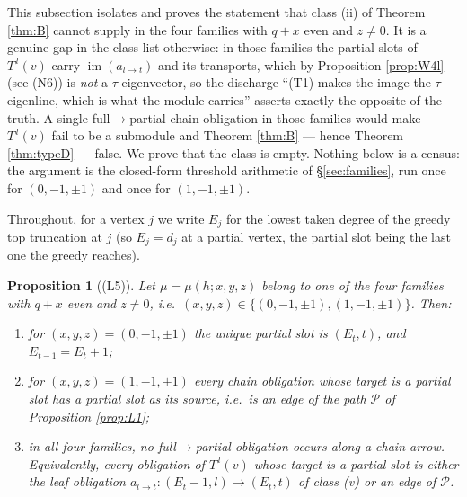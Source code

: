 \documentclass[reqno]{amsart}
\theoremstyle{plain}
\newtheorem{proposition}[theorem]{Proposition}
\theoremstyle{definition}
\DeclareMathOperator{\im}{im}
\begin{document}
This subsection isolates and proves the statement that class (ii) of Theorem
\ref{thm:B} cannot supply in the four families with $q+x$ even and $z\ne0$.
It is a genuine gap in the class list otherwise: in those families the partial
slots of $T^{\,l}(v)$ carry $\im(a_{l\to t})$ and its transports, which by
Proposition \ref{prop:W4l} (see \textup{(N6)}) is \emph{not} a
$\tau$-eigenvector, so the discharge ``(T1) makes the image the
$\tau$-eigenline, which is what the module carries'' asserts exactly the
opposite of the truth.  A single full$\to$partial chain obligation in those
families would make $T^{\,l}(v)$ fail to be a submodule and Theorem
\ref{thm:B} --- hence Theorem \ref{thm:typeD} --- false.  We prove that the
class is empty.  Nothing below is a census: the argument is the closed-form
threshold arithmetic of \S\ref{sec:families}, run once for $(0,-1,\pm1)$ and
once for $(1,-1,\pm1)$.

Throughout, for a vertex $j$ we write $E_j$ for the lowest taken
degree of the greedy top truncation at $j$ (so $E_j=d_j$ at a
partial vertex, the partial slot being the last one the greedy reaches).

\begin{proposition}[\textup{(L5)}]\label{prop:L5}
Let $\mu=\mu(h;x,y,z)$ belong to one of the four families with $q+x$ even and
$z\ne0$, i.e.\ $(x,y,z)\in\{(0,-1,\pm1),(1,-1,\pm1)\}$.  Then:
\begin{enumerate}
\item[\textup{(a)}] for $(x,y,z)=(0,-1,\pm1)$ the unique partial slot is
$(E_t,t)$, and $E_{t-1}=E_t+1$;
\item[\textup{(b)}] for $(x,y,z)=(1,-1,\pm1)$ every chain obligation whose
target is a partial slot has a partial slot as its source, i.e.\ is an edge of
the path $\mathcal{P}$ of Proposition \ref{prop:L1};
\item[\textup{(c)}] in all four families, \emph{no full$\to$partial obligation
occurs along a chain arrow}.  Equivalently, every obligation of $T^{\,l}(v)$
whose target is a partial slot is either the leaf obligation
$a_{l\to t}:(E_t-1,l)\to(E_t,t)$ of class \textup{(v)} or an edge of
$\mathcal{P}$.
\end{enumerate}
\end{proposition}
\end{document}
